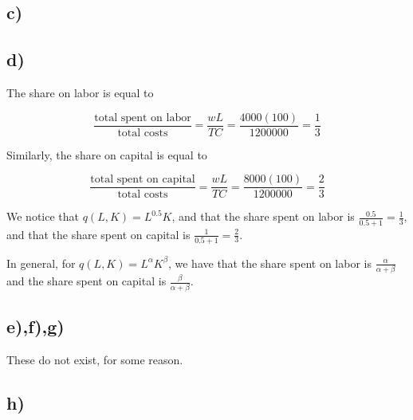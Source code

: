 \documentclass[12pt,letterpaper]{article}
\theoremstyle{definition}
\begin{document}
\subsection*{c)}

\begin{center}
\end{center}

\subsection*{d)}

The share on labor is equal to

\[
  \frac{\text{total spent on labor}}{\text{total costs}} = \frac{wL}{TC} =
    \frac{4000(100)}{1200000} = \frac{1}{3}
\]

Similarly, the share on capital is equal to

\[
  \frac{\text{total spent on capital}}{\text{total costs}} = \frac{wL}{TC} =
  \frac{8000(100)}{1200000} = \frac{2}{3}
\]

We notice that $q(L,K) = L^{0.5}K$, and that the share spent on labor is
$\frac{0.5}{0.5+1} = \frac{1}{3}$, and that the share spent on capital is
$\frac{1}{0.5+1} = \frac{2}{3}$.

In general, for $q(L,K) = L^{\alpha}K^{\beta}$, we have that the share spent on
labor is $\frac{\alpha}{\alpha+\beta}$ and the share spent on capital is
$\frac{\beta}{\alpha+\beta}$.

\subsection*{e),f),g)}

These do not exist, for some reason.

\subsection*{h)}
\end{document}
